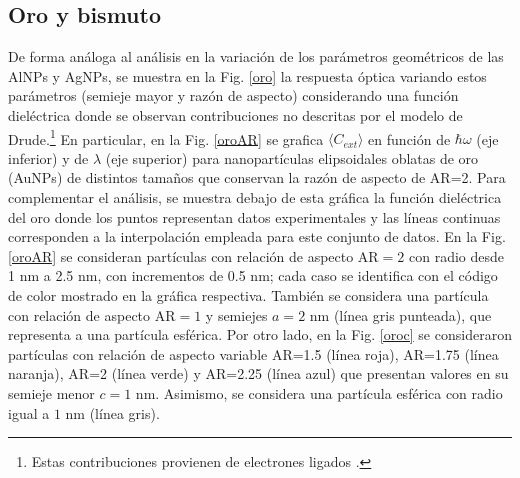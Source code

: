 \subsection*{Oro y bismuto}
De forma análoga al análisis en la variación de los parámetros geométricos de las AlNPs y AgNPs, se muestra en la Fig. \ref{oro} la respuesta óptica variando estos parámetros (semieje mayor y razón de aspecto) considerando una función dieléctrica donde se observan contribuciones no descritas por el modelo de Drude.\footnote{Estas contribuciones provienen de electrones ligados \cite{Plasmonics}.} En particular, en la Fig. \ref{oroAR} se grafica $\langle C_{ext}\rangle$ en función de $\hbar\omega$ (eje inferior) y de $\lambda$ (eje superior) para nanopartículas elipsoidales oblatas de oro (AuNPs) de distintos tamaños que conservan la razón de aspecto de AR=2. Para complementar el análisis, se muestra debajo de esta gráfica la función dieléctrica del oro donde los puntos representan datos experimentales \cite{Plata} y las líneas continuas corresponden a la interpolación empleada para este conjunto de datos. En la Fig. \ref{oroAR} se consideran partículas con relación de aspecto AR$=2$ con radio desde 1  nm a 2.5 nm, con incrementos de 0.5 nm; cada caso se identifica con el código de color mostrado en la gráfica respectiva. También se considera una partícula con relación de aspecto AR$=1$ y semiejes $a=2$ nm (línea gris punteada), que representa a una partícula esférica. Por otro lado, en la Fig. \ref{oroc} se consideraron partículas con relación de aspecto variable AR=1.5 (línea roja), AR=1.75 (línea naranja), AR=2 (línea verde) y AR=2.25 (línea azul) que presentan valores en su semieje menor $c=1\text{ nm}$. Asimismo, se considera una partícula esférica con radio igual a $1\text{ nm}$ (línea gris).\\
